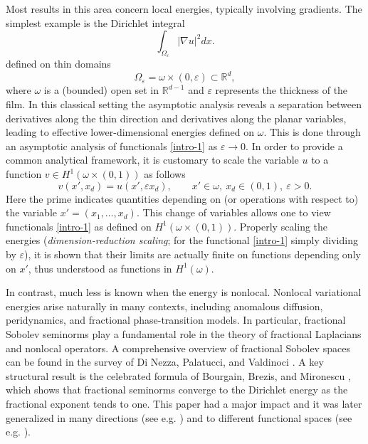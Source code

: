 \documentclass[11pt]{article}
\def\e{\varepsilon}
\begin{document}
Most results in this area concern local energies, typically involving gradients. The simplest example is the Dirichlet integral
\begin{equation}\label{intro-1}
\int_{\Omega_\e} |\nabla u|^2dx.
\end{equation}
defined on thin domains
$$
\Omega_\e=\omega\times(0,\e)\subset \mathbb R^d,
$$ where $\omega$ is a (bounded) open set in $\mathbb R^{d-1}$ and $\e$ represents the thickness of the film. In this classical setting the asymptotic analysis reveals a separation between derivatives along the thin direction and derivatives along the planar variables, leading to effective lower-dimensional energies defined on $\omega$. This is done through an asymptotic analysis of functionals \eqref{intro-1} as $\e\to 0$. In order to provide a common analytical framework, it is customary to scale the variable $u$ to a function $v\in H^1(\omega\times (0,1))$ as follows
\begin{equation}\label{intro-2}
v(x',x_d)=u(x',\e x_d), \qquad x'\in\omega,\  x_d\in(0,1),\ \varepsilon>0.
\end{equation}
Here the prime indicates quantities depending on (or operations with respect to) the variable $x'=(x_1,\ldots,x_d)$. This change of variables allows one to view functionals \eqref{intro-1} as defined on $H^1(\omega\times (0,1))$. Properly scaling the energies ({\em dimension-reduction scaling}; for the functional \eqref{intro-1} simply dividing by $\e$), it is shown that their limits are actually finite on functions depending only on $x'$, thus understood as functions in $H^1(\omega)$.

In contrast, much less is known when the energy is nonlocal. Nonlocal variational energies arise naturally in many contexts, including anomalous diffusion, peridynamics, and fractional phase-transition models. In particular, fractional Sobolev seminorms play a fundamental role in the theory of fractional Laplacians and nonlocal operators. A comprehensive overview of fractional Sobolev spaces can be found in the survey of Di Nezza, Palatucci, and Valdinoci \cite{DPV}. A key structural result is the celebrated formula of Bourgain, Brezis, and Mironescu \cite{BBM}, which shows that fractional seminorms converge to the Dirichlet energy as the fractional exponent tends to one. This paper had a major impact and it was later generalized in many directions (see e.g. \cite{ponce,MR1942116,MR4275122,MR3556344,MR4682567, MR5012373,Davo, MR4999552,MR4788002}) and to different functional spaces (see e.g. \cite{MR4525722, MR1942130,MR2832587,MR3132740, ponce}).
\end{document}
